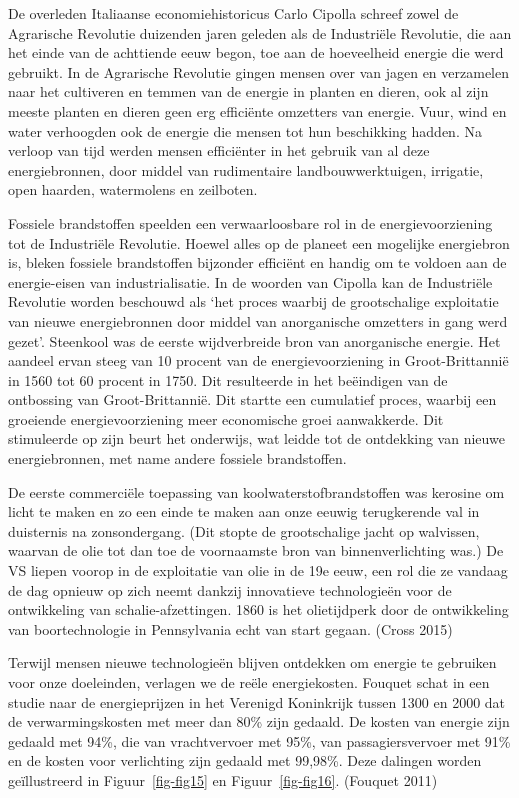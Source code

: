 \documentclass[
  a5paper,
  smalldemyvopaper,11pt,twoside,onecolumn,openright,extrafontsizes,
hidelinks]{memoir}
\begin{document}
De overleden Italiaanse economiehistoricus Carlo Cipolla schreef zowel
de Agrarische Revolutie duizenden jaren geleden als de Industriële
Revolutie, die aan het einde van de achttiende eeuw begon, toe aan de
hoeveelheid energie die werd gebruikt. In de Agrarische Revolutie gingen
mensen over van jagen en verzamelen naar het cultiveren en temmen van de
energie in planten en dieren, ook al zijn meeste planten en dieren geen
erg efficiënte omzetters van energie. Vuur, wind en water verhoogden ook
de energie die mensen tot hun beschikking hadden. Na verloop van tijd
werden mensen efficiënter in het gebruik van al deze energiebronnen,
door middel van rudimentaire landbouwwerktuigen, irrigatie, open
haarden, watermolens en zeilboten.

Fossiele brandstoffen speelden een verwaarloosbare rol in de
energievoorziening tot de Industriële Revolutie. Hoewel alles op de
planeet een mogelijke energiebron is, bleken fossiele brandstoffen
bijzonder efficiënt en handig om te voldoen aan de energie-eisen van
industrialisatie. In de woorden van Cipolla kan de Industriële Revolutie
worden beschouwd als `het proces waarbij de grootschalige exploitatie
van nieuwe energiebronnen door middel van anorganische omzetters in gang
werd gezet'. Steenkool was de eerste wijdverbreide bron van anorganische
energie. Het aandeel ervan steeg van 10 procent van de
energievoorziening in Groot-Brittannië in 1560 tot 60 procent in 1750.
Dit resulteerde in het beëindigen van de ontbossing van
Groot-Brittannië. Dit startte een cumulatief proces, waarbij een
groeiende energievoorziening meer economische groei aanwakkerde. Dit
stimuleerde op zijn beurt het onderwijs, wat leidde tot de ontdekking
van nieuwe energiebronnen, met name andere fossiele brandstoffen.

De eerste commerciële toepassing van koolwaterstofbrandstoffen was
kerosine om licht te maken en zo een einde te maken aan onze eeuwig
terugkerende val in duisternis na zonsondergang. (Dit stopte de
grootschalige jacht op walvissen, waarvan de olie tot dan toe de
voornaamste bron van binnenverlichting was.) De VS liepen voorop in de
exploitatie van olie in de 19e eeuw, een rol die ze vandaag de dag
opnieuw op zich neemt dankzij innovatieve technologieën voor de
ontwikkeling van schalie-afzettingen. 1860 is het olietijdperk door de
ontwikkeling van boortechnologie in Pennsylvania echt van start gegaan.
(Cross 2015)

Terwijl mensen nieuwe technologieën blijven ontdekken om energie te
gebruiken voor onze doeleinden, verlagen we de reële energiekosten.
Fouquet schat in een studie naar de energieprijzen in het Verenigd
Koninkrijk tussen 1300 en 2000 dat de verwarmingskosten met meer dan
80\% zijn gedaald. De kosten van energie zijn gedaald met 94\%, die van
vrachtvervoer met 95\%, van passagiersvervoer met 91\% en de kosten voor
verlichting zijn gedaald met 99,98\%. Deze dalingen worden geïllustreerd
in Figuur~\ref{fig-fig15} en Figuur~\ref{fig-fig16}. (Fouquet 2011)
\end{document}
